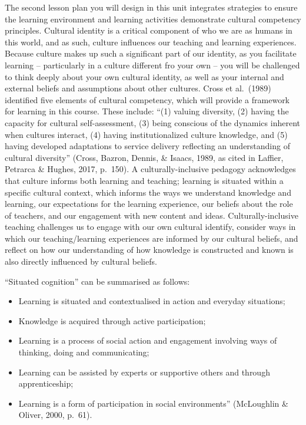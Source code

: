 \documentclass[
]{book}
\providecommand{\tightlist}{%
  \setlength{\itemsep}{0pt}\setlength{\parskip}{0pt}}
\begin{document}
The second lesson plan you will design in this unit integrates strategies to ensure the learning environment and learning activities demonstrate cultural competency principles.
Cultural identity is a critical component of who we are as humans in this world, and as such, culture influences our teaching and learning experiences. Because culture makes up such a significant part of our identity, as you facilitate learning -- particularly in a culture different fro your own -- you will be challenged to think deeply about your own cultural identity, as well as your internal and external beliefs and assumptions about other cultures.
Cross et al.~(1989) identified five elements of cultural competency, which will provide a framework for learning in this course. These include: ``(1) valuing diversity, (2) having the capacity for cultural self-assessment, (3) being conscious of the dynamics inherent when cultures interact, (4) having institutionalized culture knowledge, and (5) having developed adaptations to service delivery reflecting an understanding of cultural diversity'' (Cross, Bazron, Dennis, \& Isaacs, 1989, as cited in Laffier, Petrarca \& Hughes, 2017, p.~150).
A culturally-inclusive pedagogy acknowledges that culture informs both learning and teaching; learning is situated within a specific cultural context, which informs the ways we understand knowledge and learning, our expectations for the learning experience, our beliefs about the role of teachers, and our engagement with new content and ideas. Culturally-inclusive teaching challenges us to engage with our own cultural identify, consider ways in which our teaching/learning experiences are informed by our cultural beliefs, and reflect on how our understanding of how knowledge is constructed and known is also directly influenced by cultural beliefs.

``Situated cognition'' can be summarised as follows:

\begin{itemize}
\tightlist
\item
  Learning is situated and contextualised in action and everyday situations;\\
\item
  Knowledge is acquired through active participation;\\
\item
  Learning is a process of social action and engagement involving ways of thinking, doing and communicating;\\
\item
  Learning can be assisted by experts or supportive others and through apprenticeship;\\
\item
  Learning is a form of participation in social environments'' (McLoughlin \& Oliver, 2000, p.~61).
\end{itemize}
\end{document}
